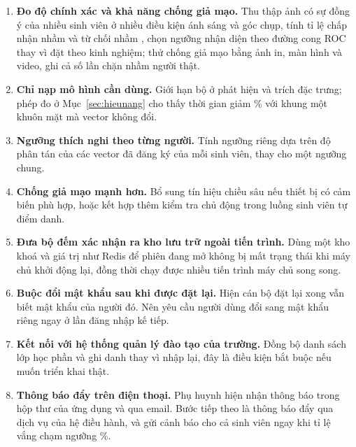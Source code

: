 \begin{enumerate}[leftmargin=1.8em, itemsep=3pt]
  \item \textbf{Đo độ chính xác và khả năng chống giả mạo.} Thu thập ảnh có
        sự đồng ý của nhiều sinh viên ở nhiều điều kiện ánh sáng và góc chụp,
        tính tỉ lệ chấp nhận nhầm và từ chối nhầm \cite{Jain2004Biometric,
        ISO19795}, chọn ngưỡng nhận diện theo đường cong ROC
        \cite{Fawcett2006ROC} thay vì đặt theo kinh nghiệm; thử chống giả mạo
        bằng ảnh in, màn hình và video, ghi cả số lần chặn nhầm người thật.
  \item \textbf{Chỉ nạp mô hình cần dùng.} Giới hạn bộ  ở
        phát hiện và trích đặc trưng; phép đo ở Mục~\ref{sec:hieunang} cho
        thấy thời gian giảm \HnGiamMotMat\% với khung một khuôn mặt mà vector
        không đổi.
  \item \textbf{Ngưỡng thích nghi theo từng người.} Tính ngưỡng riêng dựa
        trên độ phân tán của các vector đã đăng ký của mỗi sinh viên, thay
        cho một ngưỡng chung.
  \item \textbf{Chống giả mạo mạnh hơn.} Bổ sung tín hiệu chiều sâu nếu
        thiết bị có cảm biến phù hợp, hoặc kết hợp thêm kiểm tra chủ động
        trong luồng sinh viên tự điểm danh.
  \item \textbf{Đưa bộ đếm xác nhận ra kho lưu trữ ngoài tiến trình.} Dùng
        một kho khoá và giá trị như Redis để phiên đang mở không bị mất
        trạng thái khi máy chủ khởi động lại, đồng thời chạy được nhiều tiến
        trình máy chủ song song.
  \item \textbf{Buộc đổi mật khẩu sau khi được đặt lại.} Hiện cán bộ đặt lại
        xong vẫn biết mật khẩu của người đó. Nên yêu cầu người dùng đổi sang
        mật khẩu riêng ngay ở lần đăng nhập kế tiếp.
  \item \textbf{Kết nối với hệ thống quản lý đào tạo của trường.} Đồng bộ
        danh sách lớp học phần và ghi danh thay vì nhập lại, đây là điều
        kiện bắt buộc nếu muốn triển khai thật.
  \item \textbf{Thông báo đẩy trên điện thoại.} Phụ huynh hiện nhận thông
        báo trong hộp thư của ứng dụng và qua email. Bước tiếp theo là thông
        báo đẩy qua dịch vụ của hệ điều hành, và gửi cảnh báo cho cả sinh viên
        ngay khi tỉ lệ vắng chạm ngưỡng \FtiLeCanhBao\%.
\end{enumerate}
